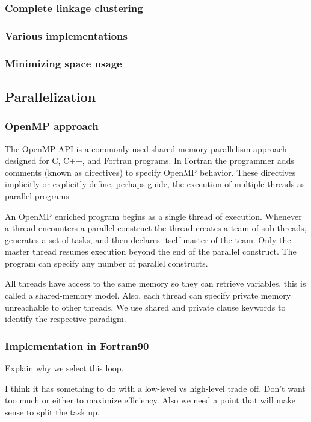 \subsubsection*{Complete linkage clustering}
\subsubsection*{Various implementations}
\subsubsection*{Minimizing space usage}
\subsection*{Parallelization}
\subsubsection*{OpenMP approach} %
The OpenMP API is a commonly used shared-memory parallelism approach designed for C, C++, and Fortran programs.
In Fortran the programmer adds comments (known as directives) to specify OpenMP behavior.
These directives implicitly or explicitly define, perhaps guide, the execution of multiple threads as parallel programs

An OpenMP enriched program begins as a single thread of execution.
Whenever a thread encounters a parallel construct the thread creates a team of sub-threads, generates a set of tasks, and then declares itself master of the team.
Only the master thread resumes execution beyond the end of the parallel construct.
The program can specify any number of parallel constructs.

All threads have access to the same memory so they can retrieve variables, this is called a shared-memory model.
Also, each thread can specify private memory unreachable to other threads.
We use shared and private clause keywords to identify the respective paradigm.

\subsubsection*{Implementation in Fortran90}
Explain why we select this loop. %

I think it has something to do with a low-level vs high-level trade off. Don't want too much or either to maximize efficiency. Also we need a point that will make sense to split the task up.

